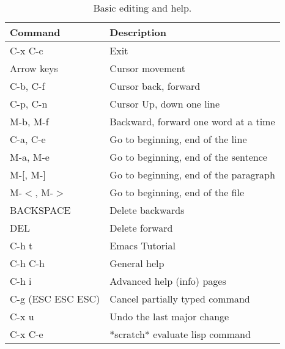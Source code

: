 \documentclass[11pt, a4paper]{article}
\begin{document}
\begin{table}[!ht]
   \caption{Basic editing and help.}
  \begin{center}
    \begin{tabular}{l l}
      \hline
      Command      & Description \\
      \hline
      C-x C-c      & Exit \\
      Arrow keys   & Cursor movement \\
      C-b, C-f     & Cursor back, forward \\
      C-p, C-n     & Cursor Up, down one line \\
      M-b, M-f     & Backward, forward one word at a time \\
      C-a, C-e     & Go to beginning, end of the line \\
      M-a, M-e     & Go to beginning, end of the sentence \\
      M-[, M-]     & Go to beginning, end of the paragraph \\
      M-$<$, M-$>$     & Go to beginning, end of the file \\
      BACKSPACE    & Delete backwards \\
      DEL          & Delete forward \\
      C-h t        & Emacs Tutorial \\
      C-h C-h      & General help \\
      C-h i        & Advanced help (info) pages \\
      C-g (ESC ESC ESC) & Cancel partially typed command \\
      C-x u        & Undo the last major change \\
      C-x C-e      & *scratch* evaluate lisp command \\
      \hline
    \end{tabular}
  \end{center}
\end{table}
\end{document}
